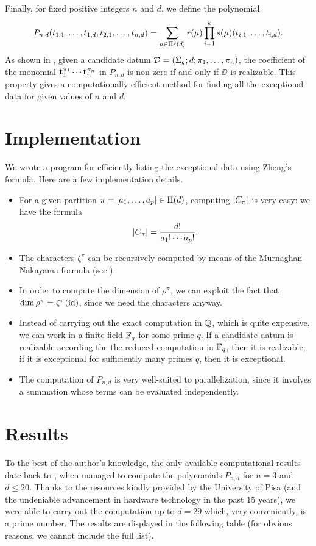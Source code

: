 Finally, for fixed positive integers $n$ and $d$, we define the polynomial
\[
P_{n,d}(t_{1,1},\ldots,t_{1,d},t_{2,1},\ldots,t_{n,d})=\sum_{\mu\in\SPartitions{d}}r(\mu)\prod_{i=1}^ks(\mu)(t_{i,1},\ldots,t_{i,d}).
\]
As shown in \cite{zheng}, given a candidate datum $\DD=\datum{\surf{g}}{d}{\pi_1,\ldots,\pi_n}$, the coefficient of the monomial $\tt_1^{\pi_1}\cdots\tt_n^{\pi_n}$ in $P_{n,d}$ is non-zero if and only if $\DD$ is realizable. This property gives a computationally efficient method for finding all the exceptional data for given values of $n$ and $d$.

\section{Implementation}\label{computational-results:sc:implementation}
We wrote a \Cpp{} program for efficiently listing the exceptional data using Zheng's formula. Here are a few implementation details.
\begin{itemize}
\item For a given partition $\pi=[a_1,\ldots,a_p]\in\Partitions{d}$, computing $\card{C_\pi}$ is very easy: we have the formula
\[
\card{C_\pi}=\frac{d!}{a_1!\cdots a_p!}.
\]
\item The characters $\zeta^\pi$ can be recursively computed by means of the Murnaghan–Nakayama formula (see ).
\item In order to compute the dimension of $\rho^\pi$, we can exploit the fact that $\dim\rho^\pi=\zeta^\pi(\id)$, since we need the characters anyway.
\item Instead of carrying out the exact computation in $\QQ$, which is quite expensive, we can work in a finite field $\FF_q$ for some prime $q$. If a candidate datum is realizable according the the reduced computation in $\FF_q$, then it is realizable; if it is exceptional for sufficiently many primes $q$, then it is exceptional.
\item The computation of $P_{n,d}$ is very well-suited to parallelization, since it involves a summation whose terms can be evaluated independently.
\end{itemize}

\section{Results}

To the best of the author's knowledge, the only available computational results date back to \citeyear{zheng}, when \citeauthor{zheng} managed to compute the polynomials $P_{n,d}$ for $n=3$ and $d\le 20$. Thanks to the resources kindly provided by the University of Pisa (and the undeniable advancement in hardware technology in the past 15 years), we were able to carry out the computation up to $d=29$ which, very conveniently, is a prime number. The results are displayed in the following table (for obvious reasons, we cannot include the full list).

